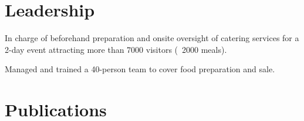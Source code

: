 \documentclass[]{deedy-resume-openfont}
\begin{document}
\begin{minipage}[t]{0.7\textwidth}
\sectionsep


\section{Leadership}
\begin{tightemize}
\item In charge of beforehand preparation and onsite oversight of catering services for a 2-day event attracting more than 7000 visitors (~2000 meals).
\item Managed and trained a 40-person team to cover food preparation and sale.
\end{tightemize}
\sectionsep


\section{Publications} 
\renewcommand\refname{\vskip -1.5em} %


\nocite{*}

\end{minipage} 
\end{document}

